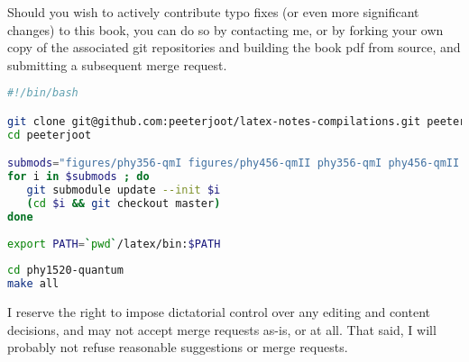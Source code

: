 %
%

Should you wish to actively contribute typo fixes (or even more significant changes) to this book, you can do so by contacting me, or by forking your own copy of the associated git repositories and building the book pdf from source, and submitting a subsequent merge request.

\begin{lstlisting}[language=bash]
#!/bin/bash

git clone git@github.com:peeterjoot/latex-notes-compilations.git peeterjoot
cd peeterjoot

submods="figures/phy356-qmI figures/phy456-qmII phy356-qmI phy456-qmII figures/phy1520-quantum phy1520-quantum julia mathematica latex"
for i in $submods ; do
   git submodule update --init $i
   (cd $i && git checkout master)
done
 
export PATH=`pwd`/latex/bin:$PATH
 
cd phy1520-quantum
make all
\end{lstlisting}

I reserve the right to impose dictatorial control over any editing and content decisions, and may not accept merge requests as-is, or at all. That said, I will probably not refuse reasonable suggestions or merge requests.
